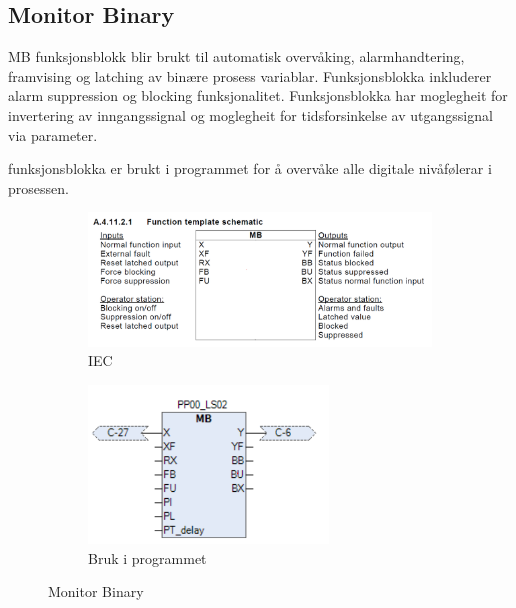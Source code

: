 \subsection{Monitor Binary}

\gls{MB} funksjonsblokk blir brukt til automatisk overvåking, alarmhandtering, framvising og latching av binære prosess variablar.
Funksjonsblokka inkluderer alarm suppression og blocking funksjonalitet. Funksjonsblokka har moglegheit for invertering av 
inngangssignal og moglegheit for tidsforsinkelse av utgangssignal via parameter.

funksjonsblokka er brukt i programmet for å overvåke alle digitale nivåfølerar i prosessen.

\begin{figure}[htbp]
    \centering
    \begin{subfigure}[b]{0.45\textwidth}
        \centering
        \includegraphics[width=1\textwidth]{Bilder/MBBlokkIEC.png}
        \caption{IEC}\label{fig:Monitor Binary blokk IEC}
    \end{subfigure}
    \hfill
    \begin{subfigure}[b]{0.45\textwidth}
        \centering
        \includegraphics[width=0.7\textwidth]{Bilder/MBBlokkIProgrammet.png}
        \caption{Bruk i programmet}\label{fig:Monitor Binary blokk i programmet}
    \end{subfigure}
    \caption{Monitor Binary}\label{fig:Monitor Binary}
\end{figure}

